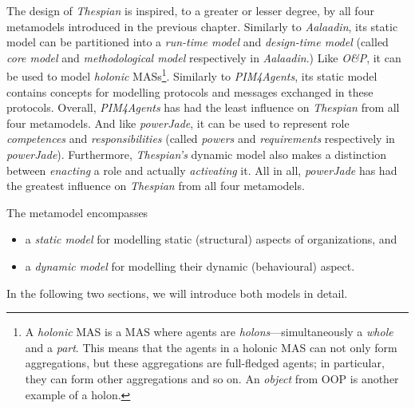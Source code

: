 The design of \textit{Thespian} is inspired, to a greater or lesser degree, by all four metamodels introduced in the previous chapter.
Similarly to \textit{Aalaadin}, its static model can be partitioned into a \textit{run-time model} and \textit{design-time model} (called \textit{core model} and \textit{methodological model} respectively in \textit{Aalaadin}.)
Like \textit{O\&P}, it can be used to model \textit{holonic} MASs\footnote{A \textit{holonic} MAS is a MAS where agents are \textit{holons}---simultaneously a \textit{whole} and a \textit{part}. This means that the agents in a holonic MAS can not only form aggregations, but these aggregations are full-fledged agents; in particular, they can form other aggregations and so on. An \textit{object} from OOP is another example of a holon.}.
Similarly to \textit{PIM4Agents}, its static model contains concepts for modelling protocols and messages exchanged in these protocols. Overall, \textit{PIM4Agents} has had the least influence on \textit{Thespian} from all four metamodels.
And like \textit{powerJade}, it can be used to represent role \textit{competences} and \textit{responsibilities} (called \textit{powers} and \textit{requirements} respectively in \textit{powerJade}).
Furthermore, \textit{Thespian's} dynamic model also makes a distinction between \textit{enacting} a role and actually \textit{activating} it.
All in all, \textit{powerJade} has had the greatest influence on \textit{Thespian} from all four metamodels.

The metamodel encompasses
\begin{itemize}
	\item a \textit{static model} for modelling static (structural) aspects of organizations, and
	\item a \textit{dynamic model} for modelling their dynamic (behavioural) aspect.
\end{itemize}
In the following two sections, we will introduce both models in detail.



